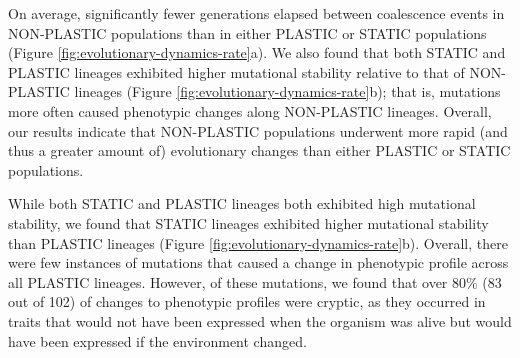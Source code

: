 

On average, significantly fewer generations elapsed between coalescence events in NON-PLASTIC populations than in either PLASTIC or STATIC populations (Figure \ref{fig:evolutionary-dynamics-rate}a).
We also found that both STATIC and PLASTIC lineages exhibited higher mutational stability relative to that of NON-PLASTIC lineages (Figure \ref{fig:evolutionary-dynamics-rate}b); that is, mutations more often caused phenotypic changes along NON-PLASTIC lineages. 
Overall, our results indicate that NON-PLASTIC populations underwent more rapid (and thus a greater amount of) evolutionary changes than either PLASTIC or STATIC populations. 

While both STATIC and PLASTIC lineages both exhibited high mutational stability, we found that STATIC lineages exhibited higher mutational stability than PLASTIC lineages (Figure \ref{fig:evolutionary-dynamics-rate}b). 
Overall, there were few instances of mutations that caused a change in phenotypic profile across all PLASTIC lineages.
However, of these mutations, we found that over 80\% (83 out of 102) of changes to phenotypic profiles were cryptic, as they occurred in traits that would not have been expressed when the organism was alive but would have been expressed if the environment changed.




